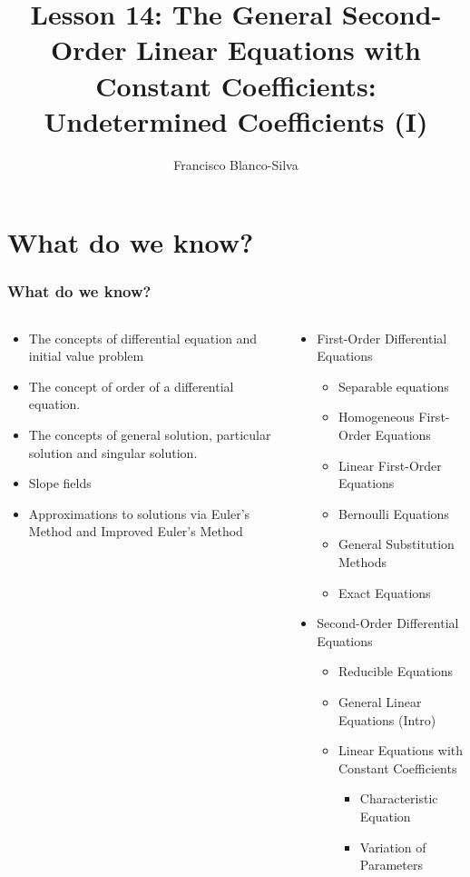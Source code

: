 \documentclass[9pt,xcolor=x11names,compress]{beamer}
\author[Francisco Blanco-Silva]{Francisco Blanco-Silva}
\institute[USC]{University of South Carolina}
\date{
\pgfdeclarelindenmayersystem{B}{
\rule{F -> FF+F+F+F+F+F-F}}
\begin{tikzpicture}[color=DeepSkyBlue4]
\draw [l-system={B, axiom=F+F+F+F, order=4, step=0.8pt, angle=90}]
lindenmayer system; 
\end{tikzpicture}
}
\title{Lesson 14: The General Second-Order Linear Equations with Constant Coefficients: Undetermined Coefficients (I)}
\begin{document}
\frame{\titlepage}

\section{What do we know?}
\begin{frame}\frametitle{What do we know?}
\begin{columns}[T]
\begin{column}{0.45\linewidth}
\begin{itemize}
\item The concepts of \alert{differential equation} and \alert{initial value problem}
\item The concept of \alert{order} of a differential equation.
\item The concepts of \alert{general solution}, \alert{particular solution} and \alert{singular solution}.
\item \alert{Slope fields}
\item Approximations to solutions via \alert{Euler's Method} and \alert{Improved Euler's Method}
\end{itemize} 
\end{column}
\begin{column}{0.55\linewidth}
\begin{itemize}
\item First-Order Differential Equations
\begin{itemize}
\item Separable equations 
\item Homogeneous First-Order Equations 
\item Linear First-Order Equations 
\item Bernoulli Equations 
\item General Substitution Methods
\item Exact Equations 
\end{itemize}
\item Second-Order Differential Equations
\begin{itemize}
	\item Reducible Equations
	\item General Linear Equations (Intro)
	\item Linear Equations with Constant Coefficients
	\begin{itemize}
		\item Characteristic Equation
		\item Variation of Parameters
	\end{itemize}
\end{itemize}
\end{itemize}
\end{column}
\end{columns}
\end{frame}
\end{document}
